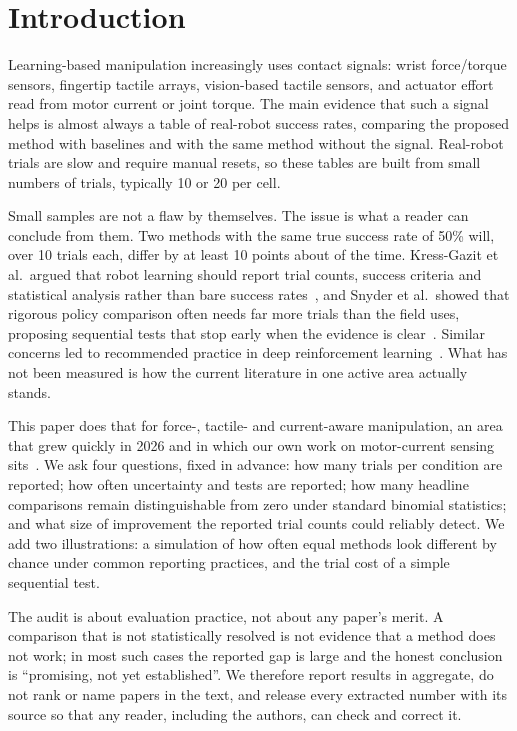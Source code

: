 \documentclass[11pt]{article}
\begin{document}
\section{Introduction}
Learning-based manipulation increasingly uses contact signals: wrist force/torque sensors, fingertip tactile arrays, vision-based tactile sensors, and actuator effort read from motor current or joint torque. The main evidence that such a signal helps is almost always a table of real-robot success rates, comparing the proposed method with baselines and with the same method without the signal. Real-robot trials are slow and require manual resets, so these tables are built from small numbers of trials, typically 10 or 20 per cell.

Small samples are not a flaw by themselves. The issue is what a reader can conclude from them. Two methods with the same true success rate of 50\% will, over 10 trials each, differ by at least 10 points about \AuditNullTenOneFiveOne{} of the time. Kress-Gazit et al.\ argued that robot learning should report trial counts, success criteria and statistical analysis rather than bare success rates~\cite{kressgazit2024}, and Snyder et al.\ showed that rigorous policy comparison often needs far more trials than the field uses, proposing sequential tests that stop early when the evidence is clear~\cite{snyder2025step,snyder2026nscore}. Similar concerns led to recommended practice in deep reinforcement learning~\cite{henderson2018,agarwal2021,colas2018}. What has not been measured is how the current literature in one active area actually stands.

This paper does that for force-, tactile- and current-aware manipulation, an area that grew quickly in 2026 and in which our own work on motor-current sensing sits~\cite{aidoo2026a}. We ask four questions, fixed in advance: how many trials per condition are reported; how often uncertainty and tests are reported; how many headline comparisons remain distinguishable from zero under standard binomial statistics; and what size of improvement the reported trial counts could reliably detect. We add two illustrations: a simulation of how often equal methods look different by chance under common reporting practices, and the trial cost of a simple sequential test.

The audit is about evaluation practice, not about any paper's merit. A comparison that is not statistically resolved is not evidence that a method does not work; in most such cases the reported gap is large and the honest conclusion is ``promising, not yet established''. We therefore report results in aggregate, do not rank or name papers in the text, and release every extracted number with its source so that any reader, including the authors, can check and correct it.
\end{document}
